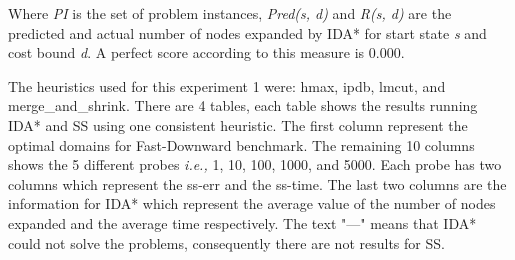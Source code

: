 \documentclass[a4paper,12pt]{article}
\begin{document}
Where \textit{PI} is the set of problem instances, \textit{Pred(s, d)} and \textit{R(s, d)} are the predicted and actual number of nodes expanded by IDA* for start state \textit{s} and cost bound \textit{d}. A perfect score according to this measure is 0.000.


The heuristics used for this experiment 1 were: hmax, ipdb, lmcut, and {merge\_and\_shrink}. There are 4 tables, each table shows the results running IDA* and SS using one consistent heuristic. The first column represent the optimal domains for Fast-Downward benchmark. The remaining 10 columns shows the 5 different probes \textit{i.e.,} 1, 10, 100, 1000, and 5000. Each probe has two columns which represent the ss-err and the ss-time. The last two columns are the information for IDA* which represent the average value of the number of nodes expanded and the average time respectively. The text "---" means that IDA* could not solve the problems, consequently there are not results for SS.
\end{document}
